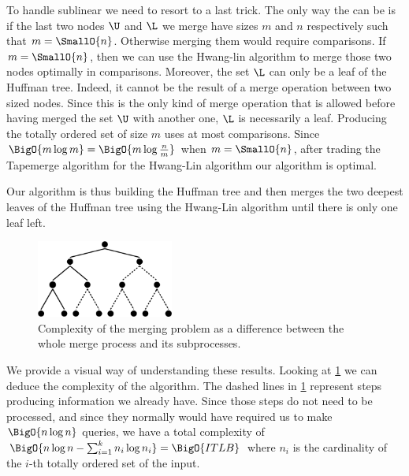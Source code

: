 To handle sublinear  we need to resort to a last trick. The only
way the  can be  is if the last two nodes \(\U\) and
\(\L\) we merge have sizes \(m\) and \(n\) respectively such that \(m =
\SmallO{n}\). Otherwise merging them would require  comparisons.
If \(m = \SmallO{n}\), then we can use the Hwang-lin algorithm to merge those
two nodes optimally in  comparisons. Moreover, the set
\(\L\) can only be a leaf of the Huffman tree. Indeed, it cannot be the result
of a merge operation between two  sized nodes. Since this is the only
kind of merge operation that is allowed before having merged the set \(\U\)
with another one, \(\L\) is necessarily a leaf.  Producing the totally ordered
set of size \(m\) uses at most  comparisons. Since \(\BigO{m
\log m} = \BigO{m \log \frac{n}{m}}\) when \(m = \SmallO{n}\), after trading
the Tapemerge algorithm for the Hwang-Lin algorithm our algorithm is optimal.

Our algorithm is thus building the Huffman tree and then merges the two deepest
leaves of the Huffman tree using the Hwang-Lin algorithm until there is only
one leaf left.

\begin{figure}
	\centering
	\includegraphics[width=0.4\textwidth]{fig/merging/huffman-2-trim}
	\caption{Complexity of the merging problem as a difference between the whole merge process and its subprocesses.}
	\label{tree:merging:fig/huffman-2}
\end{figure}

We provide a visual way of understanding these results. Looking at
\ref{tree:merging:fig/huffman-2} we can deduce the complexity of the algorithm.
The dashed lines in \ref{tree:merging:fig/huffman-2} represent steps producing
information we already have. Since those steps do not need to be processed, and
since they normally would have required us to make \(\BigO{n \log n}\) queries, we have a
total complexity of $\BigO{n \log n - \sum_{i=1}^{k} n_i \log n_i} =
\BigO{ITLB}$ where $n_i$ is the cardinality of the $i$-th totally ordered set
of the input.
